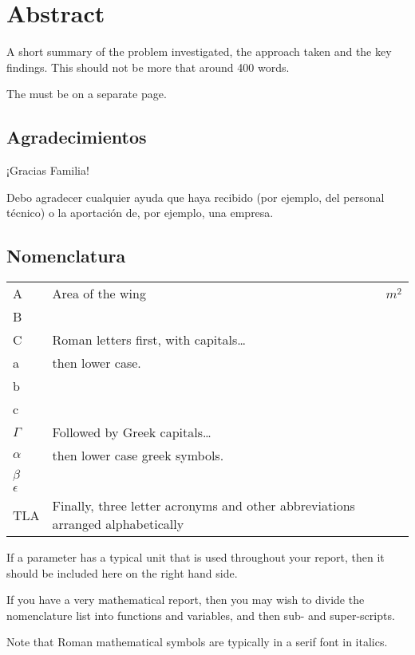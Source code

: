 \documentclass[a4paper,oneside,12pt]{book}
\title{\thesistitle}
\author{\authorname}
\begin{document}


\chapter*{Abstract}
A short summary of the problem investigated, the approach taken and the key findings. This should not be more that around 400 words.

The must be on a separate page.


\newpage

\section*{\Huge{Agradecimientos}}
¡Gracias Familia!

Debo agradecer cualquier ayuda que haya recibido (por ejemplo, del personal técnico) o la aportación de, por ejemplo, una empresa.

\renewcommand*\contentsname{Contenido}
\renewcommand{\listfigurename}{Lista de Figuras}
\renewcommand{\listtablename}{Lista de Tablas}
\tableofcontents
\listoffigures
\listoftables
\newpage
\section*{\Huge{Nomenclatura}}
\begin{tabular}{lp{9cm}l}
A&Area of the wing&$m^{2}$\\
B\\
C& Roman letters first, with capitals\ldots\\
a&then lower case.\\
b\\
c\\
$\Gamma$&Followed by Greek capitals\ldots\\
$\alpha$&then lower case greek symbols.\\
$\beta$\\
$\epsilon$\\
TLA&Finally, three letter acronyms and other abbreviations arranged alphabetically\\
\end{tabular}
\vspace{2cm}

If a parameter has a typical unit that is used throughout your report, then it should be included here on the right hand side.

If you have a very mathematical report, then you may wish to divide the nomenclature list into functions and variables, and then sub- and super-scripts.

Note that Roman mathematical symbols are typically in a serif font in italics.

\mainmatter
%





\renewcommand{\bibname}{Referencias Bibliográficas}

\appendix
\renewcommand{\thechapter}{A\arabic{chapter}}

\end{document}
